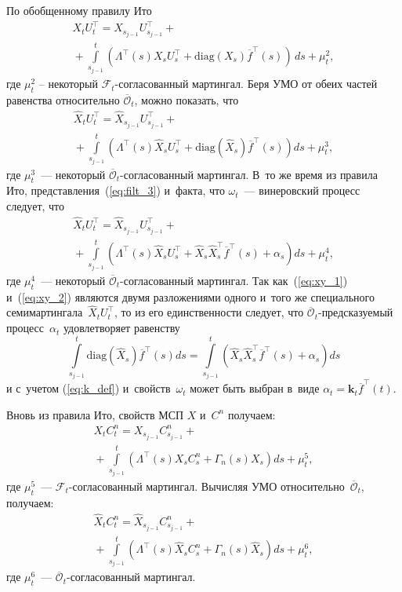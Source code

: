 \begin{multicols}{2}
{По обобщенному правилу Ито
\begin{multline*}
X_tU_t^{\top}= X_{s_{j-1}}U_{s_{j-1}}^{\top}+{}\\
{}+
\int\limits_{s_{j-1}}^t \left(
\Lambda^{\top}(s)X_{s}U_{s}^{\top} + \mathrm{diag}\left(X_{s}\right)\overline{f}^{\top}(s)
\right)\,ds + \mu_t^2,
\end{multline*}
где $\mu_t^2$ -- некоторый $\mathcal{F}_t$-со\-гла\-со\-ван\-ный мартингал.
Беря УМО от обеих частей равенства относительно  $\overline{\mathcal{O}}_{t}$, можно показать, что
\begin{multline}
\widehat{X}_tU_t^{\top}= \widehat{X}_{s_{j-1}}U_{s_{j-1}}^{\top}+ {}\\
{}+\int\limits_{s_{j-1}}^t \left(
\Lambda^{\top}(s)\widehat{X}_{s}U_{s}^{\top} + \mathrm{diag}\left(\widehat{X}_{s}\right)\overline{f}^{\top}(s)
\right)ds + \mu_t^3,
\label{eq:xy_1}
\end{multline}
где $\mu_t^3$~--- некоторый $\overline{\mathcal{O}}_t$-со\-гла\-со\-ван\-ный мартингал. 
В~то же время из правила Ито, представления~(\ref{eq:filt_3}) и~факта, что $\omega_t$~--- 
винеровский процесс следует, что
\begin{multline}
\widehat{X}_tU_t^{\top}=  \widehat{X}_{s_{j-1}}U_{s_{j-1}}^{\top}+ {}\\
\!\!{}+ \!\!\int\limits_{s_{j-1}}^t\!\! \left(
\Lambda^{\top}(s)\widehat{X}_{s}U_{s}^{\top} + \widehat{X}_{s}\widehat{X}_{s}^{\top}
\overline{f}^{\top}(s) + \alpha_s
\right)ds + \mu_t^4,\!\!
\label{eq:xy_2}
\end{multline}
где $\mu_t^4$~--- некоторый $\overline{\mathcal{O}}_t$-со\-гла\-со\-ван\-ный мартингал. Так
как~(\ref{eq:xy_1}) и~(\ref{eq:xy_2})
являются двумя разложениями одного и~того же специального семимартингала~$\widehat{X}_tU_t^{\top}$, 
то из его единственности следует, что $\overline{\mathcal{O}}_{t}$-пред\-ска\-зу\-емый процесс~$\alpha_t$ 
удовлетворяет равенству
$$
\int\limits_{s_{j-1}}^t
\mathrm{diag}\left(\widehat{X}_{s}\right)\overline{f}^{\top}(s)
ds=\int\limits_{s_{j-1}}^t \left(\widehat{X}_{s}\widehat{X}_{s}^{\top}\overline{f}^{\top}(s) + \alpha_s
\right)ds
$$
и с~учетом (\ref{eq:k_def}) и~свойств~$\omega_t$ может быть выбран в~виде
$
\alpha_t = \mathbf{k}_{t} \overline{f}^{\top}(t).
$

Вновь из правила Ито, свойств МСП $X$ и~$C^n$ по\-лу\-чаем:
\begin{multline*}
X_tC_t^n =
X_{s_{j-1}}C^n_{s_{j-1}} +{}\\
{}+ \int\limits_{s_{j-1}}^t \!\!
\left(
\Lambda^{\top}(s)X_sC^n_s + \Gamma_n(s)X_s
\right)ds  + \mu^5_t,
\end{multline*}
где  $\mu_t^5$~--- $\mathcal{F}_t$-со\-гла\-со\-ван\-ный мартингал. 
Вычисляя УМО  относительно~$\overline{\mathcal{O}}_{t}$, получаем:
\begin{multline}
\widehat{X}_tC_t^n =
\widehat{X}_{s_{j-1}}C^n_{s_{j-1}} +{}\\
{}+\int\limits_{s_{j-1}}^t
\left(
\Lambda^{\top}(s)\widehat{X}_sC^n_s + \Gamma_n(s)\widehat{X}_s
\right)ds + \mu^6_t, 
\label{eq:xz_1}
\end{multline}
где $\mu_t^6$~--- $\overline{\mathcal{O}}_{t}$-со\-гла\-со\-ван\-ный мартингал.

}
\end{multicols}
